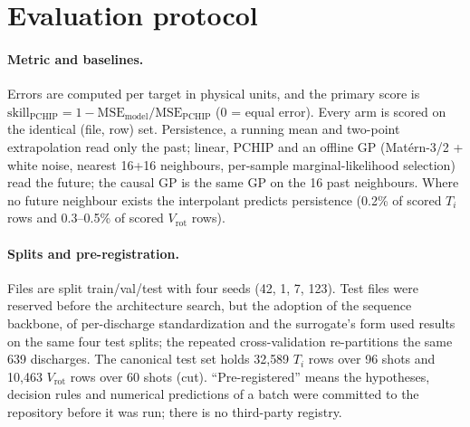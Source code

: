 \documentclass[10pt,twocolumn,letterpaper]{article}
\newcommand{\Ti}{\ensuremath{T_i}}
\newcommand{\Vrot}{\ensuremath{V_\mathrm{rot}}}
\newcommand{\skillp}{\ensuremath{\mathrm{skill}_{\mathrm{PCHIP}}}}
\begin{document}
\section{Evaluation protocol}
\label{sec:eval}

\paragraph{Metric and baselines.} Errors are computed per target in physical units,
and the primary score is $\skillp = 1 - \mathrm{MSE}_{\mathrm{model}}/\mathrm{MSE}_{\mathrm{PCHIP}}$
(0 = equal error). Every arm is scored on the identical (file, row) set. Persistence,
a running mean and two-point extrapolation read only the past; linear, PCHIP and an
offline GP (Matérn-3/2 + white noise, nearest 16+16 neighbours, per-sample
marginal-likelihood selection) read the future; the causal GP is the same GP on the 16
past neighbours. Where no future neighbour exists the interpolant predicts persistence
(0.2\% of scored \Ti{} rows and 0.3--0.5\% of scored \Vrot{} rows).

\paragraph{Splits and pre-registration.} Files are split train/val/test with four
seeds (42, 1, 7, 123). Test files were reserved before the architecture search, but
the adoption of the sequence backbone, of per-discharge standardization and the
surrogate's form used results on the same four test splits; the repeated
cross-validation re-partitions the same 639 discharges. The canonical test set holds
32{,}589 \Ti{} rows over 96 shots and 10{,}463 \Vrot{} rows over 60 shots (cut).
``Pre-registered'' means the hypotheses, decision rules and numerical predictions of a
batch were committed to the repository before it was run; there is no third-party
registry.
\end{document}
